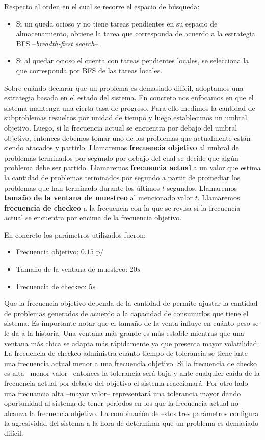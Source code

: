 Respecto al orden en el cual se recorre el espacio de búsqueda:

\begin{itemize}
	\item Si un \w queda ocioso y no tiene tareas pendientes en su espacio de almacenamiento, obtiene la tarea que corresponda de acuerdo a la estrategia BFS --\emph{breadth-first search}--.
	\item Si al quedar ocioso el \w cuenta con tareas pendientes locales, se selecciona la que corresponda por BFS de las tareas locales.
\end{itemize}

Sobre cuándo declarar que un problema es demasiado difícil, adoptamos una
estrategia basada en el estado del sistema. En concreto nos enfocamos en que
el sistema mantenga una cierta tasa de progreso. Para ello medimos la cantidad
de subproblemas resueltos por unidad de tiempo y luego establecimos un umbral
objetivo. Luego, si la frecuencia actual se encuentra por debajo del umbral
objetivo, entonces debemos tomar uno de los problemas que actualmente están
siendo atacados y partirlo. Llamaremos \textbf{frecuencia objetivo} al umbral
de problemas terminados por segundo por debajo del cual se decide que algún
problema debe ser partido. Llamaremos \textbf{frecuencia actual} a un valor
que estima la cantidad de problemas terminados por segundo a partir de
promediar los problemas que han terminado durante los últimos $t$ segundos.
Llamaremos \textbf{tamaño de la ventana de muestreo} al mencionado valor $t$.
Llamaremos \textbf{frecuencia de checkeo} a la frecuencia con la que se revisa
si la frecuencia actual se encuentra por encima de la frecuencia objetivo.

En concreto los parámetros utilizados fueron:

\begin{itemize}
	\item Frecuencia objetivo: $0.15$ p/\w
	\item Tamaño de la ventana de muestreo: $20s$
	\item Frecuencia de checkeo: $5s$
\end{itemize}

Que la frecuencia objetivo dependa de la cantidad de \ws permite ajustar la
cantidad de problemas generados de acuerdo a la capacidad de consumirlos que
tiene el sistema. Es importante notar que el tamaño de la venta influye en
cuánto peso se le da a la historia. Una ventana más grande es más estable
mientras que una ventana más chica se adapta más rápidamente ya que presenta
mayor volatilidad. La frecuencia de checkeo administra cuánto tiempo de
tolerancia se tiene ante una frecuencia actual menor a una frecuencia
objetivo. Si la frecuencia de checko es alta --menor valor-- entonces la
tolerancia será baja y ante cualquier caída de la frecuencia actual por debajo
del objetivo el sistema reaccionará. Por otro lado una frecuancia alta --mayor
valor-- representará una tolerancia mayor dando oportunidad al sistema de
tener períodos en los que la frecuencia actual no alcanza la frecuencia
objetivo. La combinación de  estos tres parámetros configura la agresividad
del sistema a la hora de determinar que un problema es demasiado difícil.

